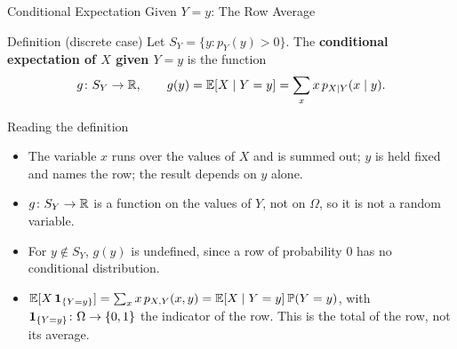 \begin{frame}{Conditional Expectation Given $Y=y$: The Row Average}
  \small
  \begin{block}{Definition (discrete case)}
    Let $S_Y=\{y : p_Y(y)>0\}$. The \textbf{conditional expectation of $X$ given $Y=y$} is the function
    \[
      g\colon S_Y\to\mathbb{R},\qquad g(y)=\mathbb{E}[X\mid Y=y]=\sum_x x\,p_{X\mid Y}(x\mid y).
    \]
  \end{block}
  \begin{block}{Reading the definition}
    \begin{itemize}
      \item The variable $x$ runs over the values of $X$ and is summed out; $y$ is held fixed and names the row; the result depends on $y$ alone.
      \item $g\colon S_Y\to\mathbb{R}$ is a function on the values of $Y$, not on $\Omega$, so it is not a random variable.
      \item For $y\notin S_Y$, $g(y)$ is undefined, since a row of probability $0$ has no conditional distribution.
      \item $\mathbb{E}[X\,\mathbf{1}_{\{Y=y\}}]=\sum_x x\,p_{X,Y}(x,y)=\mathbb{E}[X\mid Y=y]\,\mathbb{P}(Y=y)$, with $\mathbf{1}_{\{Y=y\}}\colon\Omega\to\{0,1\}$ the indicator of the row. This is the total of the row, not its average.
    \end{itemize}
  \end{block}
\end{frame}

